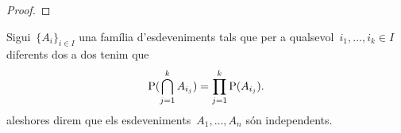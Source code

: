 \documentclass[../probabilitat.tex]{subfiles}
\begin{document}
    \begin{proof}
    \end{proof}
    \begin{definition}
        \label{def:esdeveniments-independents-cas-general}
        Sigui~\(\{A_{i}\}_{i\in I}\) una família d'esdeveniments tals que per a qualsevol~\(i_{1},\dots,i_{k}\in I\) diferents dos a dos tenim que
        \[
            \mathrm{P}(\bigcap_{j=1}^{k}A_{i_{j}})=\prod_{j=1}^{k}\mathrm{P}(A_{i_{j}}).
        \]
        aleshores direm que els esdeveniments~\(A_{1},\dots,A_{n}\) són independents.
    \end{definition}
\end{document}
